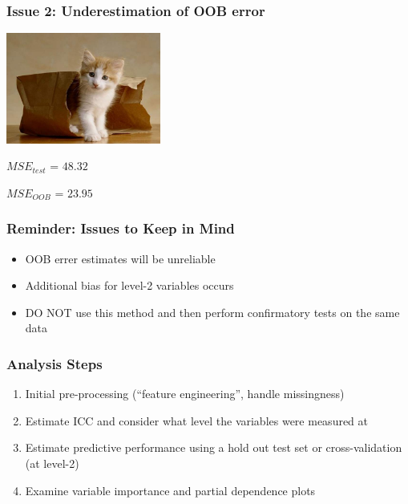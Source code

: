 \documentclass{beamer}\usepackage[]{graphicx}\usepackage[]{color}
\begin{document}

\begin{frame}
\frametitle{Issue 2: Underestimation of OOB error}



\begin{multicols}{2}

\begin{center}
\includegraphics[width = 2in]{figure/oob.jpg}
\end{center}

\columnbreak

\begin{center}

$MSE_{test}$ = $48.32$ 

\vspace{3ex}

$MSE_{OOB}$ = $23.95$

\end{center}

\end{multicols}

\end{frame}


\begin{frame}
\frametitle{Reminder: Issues to Keep in Mind}

\begin{itemize}
\item OOB errer estimates will be unreliable
\item Additional bias for level-2 variables occurs
\item DO NOT use this method and then perform confirmatory tests on the same data
\end{itemize}

\end{frame}


\begin{frame}
\frametitle{Analysis Steps}

\begin{enumerate}
\item Initial pre-processing (``feature engineering'', handle missingness)
\item Estimate ICC and consider what level the variables were measured at
\item Estimate predictive performance using a hold out test set or cross-validation (at level-2)
\item Examine variable importance and partial dependence plots
\end{enumerate}

\end{frame}
\end{document}
